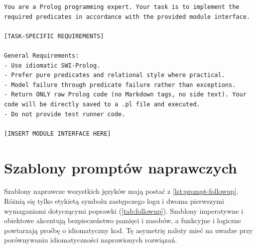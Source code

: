 \begin{lstlisting}[style=prompt,caption={Szablon promptu początkowego: Prolog.}]
You are a Prolog programming expert. Your task is to implement the required predicates in accordance with the provided module interface.

[TASK-SPECIFIC REQUIREMENTS]

General Requirements:
- Use idiomatic SWI-Prolog.
- Prefer pure predicates and relational style where practical.
- Model failure through predicate failure rather than exceptions.
- Return ONLY raw Prolog code (no Markdown tags, no side text). Your code will be directly saved to a .pl file and executed.
- Do not provide test runner code.

[INSERT MODULE INTERFACE HERE]
\end{lstlisting}

\section{Szablony promptów naprawczych}

Szablony naprawcze wszystkich języków mają postać z \cref{lst:prompt-followup}. Różnią się tylko
etykietą symbolu zastępczego logu i dwoma pierwszymi wymaganiami dotyczącymi poprawki
(\cref{tab:followup}). Szablony imperatywne i obiektowe akcentują bezpieczeństwo pamięci i zasobów,
a funkcyjne i logiczne powtarzają prośbę o idiomatyczny kod. Tę asymetrię należy mieć na uwadze
przy porównywaniu idiomatyczności naprawionych rozwiązań.

